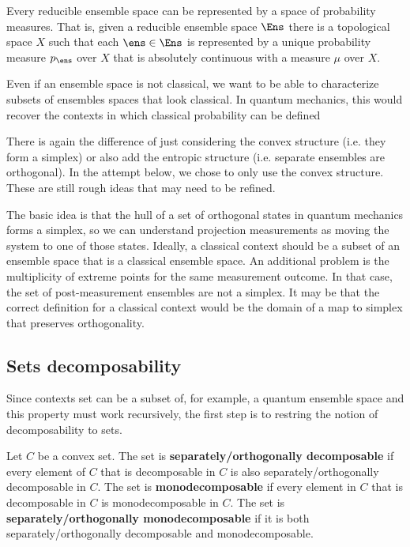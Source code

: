 \begin{conj}
	Every reducible ensemble space can be represented by a space of probability measures. That is, given a reducible ensemble space $\Ens$ there is a topological space $X$ such that each $\ens \in \Ens$ is represented by a unique probability measure $p_{\ens}$ over $X$ that is absolutely continuous with a measure $\mu$ over $X$.
\end{conj}


{Even if an ensemble space is not classical, we want to be able to characterize subsets of ensembles spaces that look classical. In quantum mechanics, this would recover the contexts in which classical probability can be defined}

There is again the difference of just considering the convex structure (i.e. they form a simplex) or also add the entropic structure (i.e. separate ensembles are orthogonal). In the attempt below, we chose to only use the convex structure. These are still rough ideas that may need to be refined.

The basic idea is that the hull of a set of orthogonal states in quantum mechanics forms a simplex, so we can understand projection measurements as moving the system to one of those states. Ideally, a classical context should be a subset of an ensemble space that is a classical ensemble space. An additional problem is the multiplicity of extreme points for the same measurement outcome. In that case, the set of post-measurement ensembles are not a simplex. It may be that the correct definition for a classical context would be the domain of a map to simplex that preserves orthogonality.


\subsection{Sets decomposability}

Since contexts set can be a subset of, for example, a quantum ensemble space and this property must work recursively, the first step is to restring the notion of decomposability to sets.

\begin{defn}
	Let $C$ be a convex set. The set is \textbf{separately/orthogonally decomposable} if every element of $C$ that is decomposable in $C$ is also separately/orthogonally decomposable in $C$. The set is \textbf{monodecomposable} if every element in $C$ that is decomposable in $C$ is monodecomposable in $C$. The set is \textbf{separately/orthogonally monodecomposable} if it is both separately/orthogonally decomposable and monodecomposable.
\end{defn}

